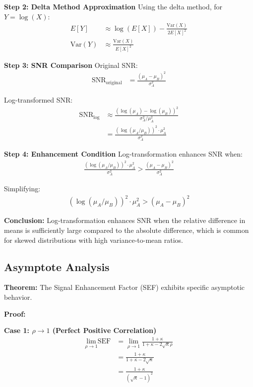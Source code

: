 \textbf{Step 2: Delta Method Approximation}
Using the delta method, for $Y = \log(X)$:
\begin{align}
E[Y] &\approx \log(E[X]) - \frac{\text{Var}(X)}{2E[X]^2} \\
\text{Var}(Y) &\approx \frac{\text{Var}(X)}{E[X]^2}
\end{align}

\textbf{Step 3: SNR Comparison}
Original SNR:
\begin{align}
\text{SNR}_{\text{original}} &= \frac{(\mu_A - \mu_B)^2}{\sigma_A^2}
\end{align}

Log-transformed SNR:
\begin{align}
\text{SNR}_{\text{log}} &\approx \frac{(\log(\mu_A) - \log(\mu_B))^2}{\sigma_A^2/\mu_A^2} \\
&= \frac{(\log(\mu_A/\mu_B))^2 \cdot \mu_A^2}{\sigma_A^2}
\end{align}

\textbf{Step 4: Enhancement Condition}
Log-transformation enhances SNR when:
\begin{align}
\frac{(\log(\mu_A/\mu_B))^2 \cdot \mu_A^2}{\sigma_A^2} > \frac{(\mu_A - \mu_B)^2}{\sigma_A^2}
\end{align}

Simplifying:
\begin{align}
(\log(\mu_A/\mu_B))^2 \cdot \mu_A^2 > (\mu_A - \mu_B)^2
\end{align}

\textbf{Conclusion:} Log-transformation enhances SNR when the relative difference in means is sufficiently large compared to the absolute difference, which is common for skewed distributions with high variance-to-mean ratios.

\subsection{Asymptote Analysis}

\textbf{Theorem:} The Signal Enhancement Factor (SEF) exhibits specific asymptotic behavior.

\textbf{Proof:}

\textbf{Case 1: $\rho \to 1$ (Perfect Positive Correlation)}
\begin{align}
\lim_{\rho \to 1} \text{SEF} &= \lim_{\rho \to 1} \frac{1 + \kappa}{1 + \kappa - 2\sqrt{\kappa}\rho} \\
&= \frac{1 + \kappa}{1 + \kappa - 2\sqrt{\kappa}} \\
&= \frac{1 + \kappa}{(\sqrt{\kappa} - 1)^2}
\end{align}

